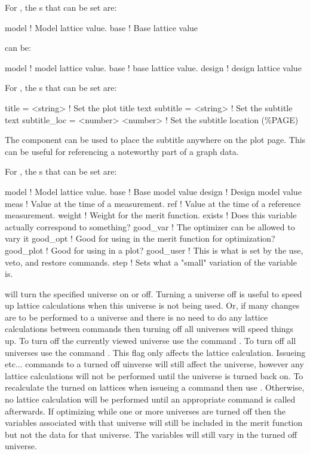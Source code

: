 For , the s that can be set are:
\begin{example}
  model      ! Model lattice value.
  base       ! Base lattice value
\end{example}
 can be:
\begin{example}
  model       ! model lattice value.
  base        ! base lattice value.
  design      ! design lattice value
\end{example}
\vskip 0.2in

For , the s that can be set are:
\begin{example}
  title        = <string>          ! Set the plot title text
  subtitle     = <string>          ! Set the subtitle text
  subtitle_loc = <number> <number> ! Set the subtitle location (\%PAGE)
\end{example}
The  component can be used to place the subtitle anywhere on
the plot page. This can be useful for referencing a noteworthy part of a graph
data.
\vskip 0.2in

For , the s that can be set are:
\begin{example}
  model       ! Model lattice value.
  base        ! Base model value
  design      ! Design model value
  meas        ! Value at the time of a measurement.
  ref         ! Value at the time of a reference measurement.
  weight      ! Weight for the merit function.
  exists      ! Does this variable actually correspond to something?
  good_var    ! The optimizer can be allowed to vary it
  good_opt    ! Good for using in the merit function for optimization?
  good_plot   ! Good for using in a plot?
  good_user   ! This is what is set by the use, veto, and restore commands.
  step       ! Sets what a "small" variation of the variable is.
\end{example}
\vskip 0.2in

 will turn the specified universe on or off. Turning
a universe off is useful to speed up lattice calculations when this
universe is not being used. Or, if many changes are to be performed to
a universe and there is no need to do any lattice calculations between
commands then turning off all universes will speed things up. To turn off 
the currently viewed universe use the command . 
To turn off all universes use the command . 
This flag only affects the lattice calculation. 
Issueing  etc...  commands to a turned off uinverse
will still affect the
universe, however any lattice calculations will not be performed until
the universe is turned back on.  To recalculate the turned on lattices
when issueing a  command then use . Otherwise, no lattice calculation will
be performed until an appropriate command is called afterwards.  If
optimizing while one or more universes are turned off then the
variables associated with that universe will still be included in the
merit function but not the data for that universe. The variables will
still vary in the turned off universe.

